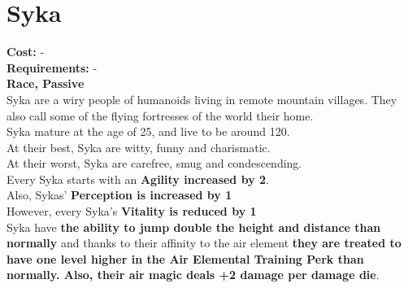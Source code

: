 \section{Syka}
\textbf{Cost:} -\\
\textbf{Requirements:} -\\
\textbf{Race, Passive}\\
Syka are a wiry people of humanoids living in remote mountain villages. They also call some of the flying fortresses of the world their home.\\
Syka mature at the age of 25, and live to be around 120.\\
At their best, Syka are witty, funny and charismatic.\\
At their worst, Syka are carefree, smug and condescending.\\
Every Syka starts with an \textbf{Agility increased by 2}.\\
Also, Sykas' \textbf{Perception is increased by 1}\\
However, every Syka's \textbf{Vitality is reduced by 1}\\
Syka have \textbf{the ability to jump double the height and distance than normally} and thanks to their affinity to the air element \textbf{they are treated to have one level higher in the Air Elemental Training Perk than normally. Also, their air magic deals +2 damage per damage die}.\\